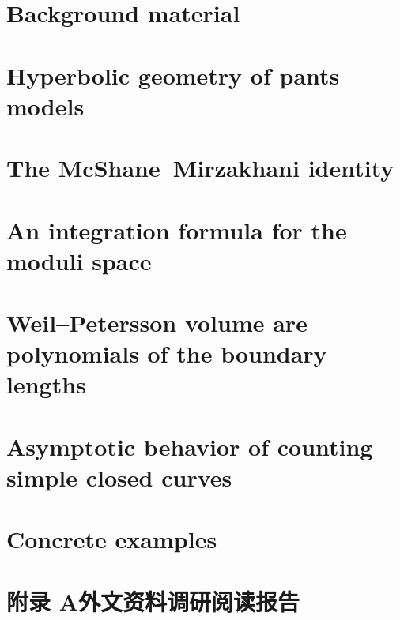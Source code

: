 \documentclass[twoside,12pt]{article}
\begin{document}
\section{Background material} \label{backg}


\clearpage

\section{Hyperbolic geometry of pants models} \label{hypergeo}


\clearpage

\section{The McShane--Mirzakhani identity} \label{MMid}


\clearpage

\section{An integration formula for the moduli space} \label{intformula}


\clearpage

\section{Weil--Petersson volume are polynomials of the boundary lengths} \label{wpvolume}


\clearpage
\section{Asymptotic behavior of counting simple closed curves} \label{asym}


\clearpage

\section{Concrete examples} \label{conexamples}



\cleardoublepage


\section*{附录 A\quad 外文资料调研阅读报告}

\clearpage
\end{document}
